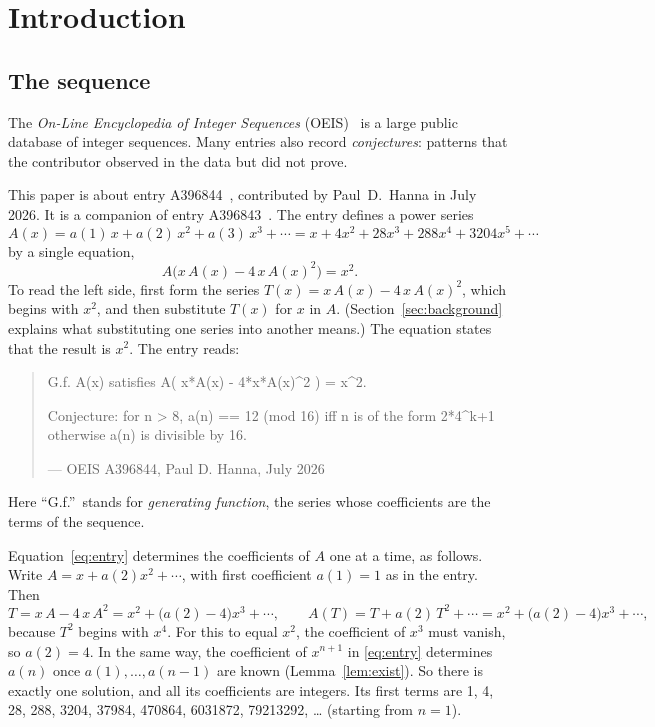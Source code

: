 \documentclass[11pt,a4paper]{article}
\theoremstyle{definition}
\theoremstyle{remark}
\begin{document}
\section{Introduction}

\subsection{The sequence}\label{sec:sequence}
The \emph{On-Line Encyclopedia of Integer Sequences} (OEIS)~\cite{oeisdb} is a large public database of integer
sequences. Many
entries also record \emph{conjectures}: patterns that the contributor observed in the data but did not prove.

This paper is about entry A396844~\cite{oeis4}, contributed by Paul~D.~Hanna in July 2026.
It is a companion of entry A396843~\cite{oeis3}.
The entry defines a power series
\[
A(x)=a(1)\,x+a(2)\,x^2+a(3)\,x^3+\cdots=x+4x^2+28x^3+288x^4+3204x^5+\cdots
\]
by a single equation,
\begin{equation}\label{eq:entry}
A\bigl(x\,A(x)-4\,x\,A(x)^2\bigr)=x^2 .
\end{equation}
To read the left side, first form the series $T(x)=x\,A(x)-4\,x\,A(x)^2$, which begins with $x^2$, and
then substitute $T(x)$ for $x$ in $A$. (Section~\ref{sec:background} explains what substituting one series into another
means.) The equation states that the result is $x^2$. The entry reads:
\begin{quote}\small\ttfamily\raggedright G.f. A(x) satisfies A( x*A(x) - 4*x*A(x)\^{}2 ) = x\^{}2.\par\smallskip Conjecture: for n > 8, a(n) == 12 (mod 16) iff n is of the form 2*4\^{}k+1 otherwise a(n) is divisible by 16.\par\smallskip\hfill\textrm{--- OEIS A396844, Paul D. Hanna, July 2026}\end{quote}

Here ``G.f.''\ stands for \emph{generating function}, the series whose coefficients are the terms of the sequence.

Equation~\eqref{eq:entry} determines the coefficients of $A$ one at a time, as follows. Write $A=x+a(2)x^2+\cdots$, with first coefficient $a(1)=1$ as in the entry. Then
\[
T=x\,A-4\,x\,A^2=x^2+\bigl(a(2)-4\bigr)x^3+\cdots,
\qquad
A(T)=T+a(2)\,T^2+\cdots=x^2+\bigl(a(2)-4\bigr)x^3+\cdots,
\]
because $T^2$ begins with $x^4$. For this to equal $x^2$, the coefficient of $x^3$ must vanish, so
$a(2)=4$. In the same way, the coefficient of $x^{n+1}$ in \eqref{eq:entry} determines $a(n)$ once
$a(1),\dots,a(n-1)$ are known (Lemma~\ref{lem:exist}). So there is exactly one solution, and all its coefficients are
integers. Its first terms are 1, 4, 28, 288, 3204, 37984, 470864, 6031872, 79213292, \dots{} (starting from $n=1$).
\end{document}
